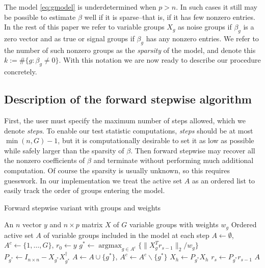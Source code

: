 \documentclass{imsart}
\newcommand{\argmax}{\mathop{\mathrm{argmax}}}
\newcommand{\norm}[1]{\lVert #1 \rVert}
\begin{document}
The model \eqref{eq:gmodel} is underdetermined when $p > n$.
In such cases it still may be possible to
estimate $\beta$ well if it is sparse--that is, if it has few nonzero
entries. In the rest of this paper we refer to variable groups $X_g$
as noise groups if $\beta_g$ is a zero vector and as true or signal
groups if $\beta_g$ has any nonzero entries. We refer to the number
of such nonzero groups as the \textit{sparsity} of the model, and
denote this $k := \# \{ g : \beta_g \neq 0 \}$. With this notation
we are now ready to describe our procedure concretely.


\subsection{Description of the forward stepwise algorithm}

First, the user must specify the maximum number of steps allowed,
which we denote \textit{steps}.
To enable our test statistic computations,
\textit{steps} should be at most $\min (n, G) - 1$, but it is
computationally desirable to set it as low as possible while
safely larger than the sparsity of $\beta$. 
Then forward stepwise may recover all the nonzero
coefficients of $\beta$ and terminate without performing much
additional computation.
Of course the sparsity is usually unknown, so this requires guesswork.
In our implementation we treat the active set $A$ as an ordered list to easily track the order of groups entering the model.

\begin{algorithm}
  \caption{Forward stepwise variant with groups and weights}
  \label{algo:fs}
  \begin{algorithmic}[1]
    \REQUIRE An $n$ vector $y$ and $n \times p$ matrix $X$ of $G$ variable groups with weights $w_g$
    \ENSURE Ordered active set $A$ of variable groups included in the model at each step
    \STATE $A \gets \emptyset$, $A^c \gets \{ 1, \ldots, G\}$, $r_0 \gets y$
    \STATE $g^* \gets \argmax_{g \in A^c} \{ \norm{X_g^Tr_{s-1}}_2 / w_g \}$
    \STATE $P_{g^*} \gets I_{n\times n} - X_{g^*}X_{g^*}^\dagger$
    \STATE $A \gets A \cup \{ g^* \}$, $A^c \gets A^c \backslash \{ g^* \}$
      \STATE $X_h \gets P_{g^*} X_h$
    \ENDFOR
    \STATE $r_s \gets P_{g^*} r_{s-1}$
    \ENDFOR
    \RETURN $A$
  \end{algorithmic}
\end{algorithm}
\end{document}
